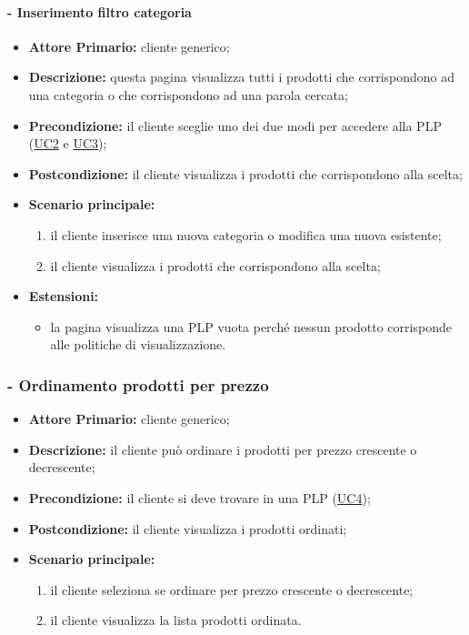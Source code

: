 \paragraph{ - Inserimento filtro categoria}
\begin{itemize}
    \item \textbf{Attore Primario:} cliente generico;
    \item \textbf{Descrizione:} questa pagina visualizza tutti i prodotti che corrispondono ad una categoria o che corrispondono ad una parola cercata;
    \item \textbf{Precondizione:} il cliente sceglie uno dei due modi per accedere alla PLP (\hyperref[UC2]{UC2} e \hyperref[UC3]{UC3});
    \item \textbf{Postcondizione:} il cliente visualizza i prodotti che corrispondono alla scelta;
    \item \textbf{Scenario principale:}
          \begin{enumerate}
              \item il cliente inserisce una nuova categoria o modifica una nuova esistente;
              \item il cliente visualizza i prodotti che corrispondono alla scelta;
          \end{enumerate}
    \item \textbf{Estensioni:}
          \begin{itemize}
              \item la pagina visualizza una PLP vuota perché nessun prodotto corrisponde alle politiche di visualizzazione.
          \end{itemize}
\end{itemize}

\stepsubUserCase
\subsubsection{ - Ordinamento prodotti per prezzo}
\begin{itemize}
    \item \textbf{Attore Primario:} cliente generico;
    \item \textbf{Descrizione:} il cliente può ordinare i prodotti per prezzo crescente o decrescente;
    \item \textbf{Precondizione:} il cliente si deve trovare in una PLP (\hyperref[UC4]{UC4});
    \item \textbf{Postcondizione:} il cliente visualizza i prodotti ordinati;
    \item \textbf{Scenario principale:}
          \begin{enumerate}
              \item il cliente seleziona se ordinare per prezzo crescente o decrescente;
              \item il cliente visualizza la lista prodotti ordinata.
          \end{enumerate}
\end{itemize}

